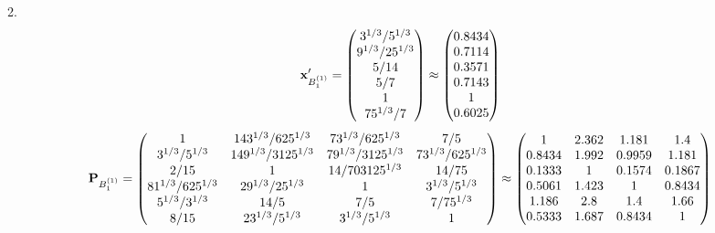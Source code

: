 \documentclass[10pt,a4paper]{article}
\begin{document}
	2.
	\[
		\bold{x}'_{B_1^{(1)}} = 
		\begin{pmatrix}
			{{3^ {1 / 3}}} / {{5^ {1 / 3}}} \\
			{{9^ {1 / 3}}} / {{25^ {1 / 3}}} \\
			{{5}} / {{14}} \\
			{{5}} / {{7}} \\
			{1}{} \\
			{{75^ {1 / 3}}} / {{7}} \\
		\end{pmatrix}
		\approx
		\begin{pmatrix}
			0.8434   \\
			0.7114   \\
			0.3571   \\
			0.7143   \\
			1        \\
			0.6025   \\
		\end{pmatrix}
	\]
	\[
		\bold{P}_{B_1^{(1)}} = 
		\begin{pmatrix}
			{1}{} & {{14}{3^ {1 / 3}}} / {{625^ {1 / 3}}} & {{7}{3^ {1 / 3}}} / {{625^ {1 / 3}}} & {{7}} / {{5}} \\
			{{3^ {1 / 3}}} / {{5^ {1 / 3}}} & {{14}{9^ {1 / 3}}} / {{3125^ {1 / 3}}} & {{7}{9^ {1 / 3}}} / {{3125^ {1 / 3}}} & {{7}{3^ {1 / 3}}} / {{625^ {1 / 3}}} \\
			{{2}} / {{15}} & {1}{} & {{14}} / {{703125^ {1 / 3}}} & {{14}} / {{75}} \\
			{{81^ {1 / 3}}} / {{625^ {1 / 3}}} & {{2}{9^ {1 / 3}}} / {{25^ {1 / 3}}} & {1}{} & {{3^ {1 / 3}}} / {{5^ {1 / 3}}} \\
			{{5^ {1 / 3}}} / {{3^ {1 / 3}}} & {{14}} / {{5}} & {{7}} / {{5}} & {{7}} / {{75^ {1 / 3}}} \\
			{{8}} / {{15}} & {{2}{3^ {1 / 3}}} / {{5^ {1 / 3}}} & {{3^ {1 / 3}}} / {{5^ {1 / 3}}} & {1}{} \\
		\end{pmatrix}
		\approx
		\begin{pmatrix}
			1        & 2.362    & 1.181    & 1.4      \\
			0.8434   & 1.992    & 0.9959   & 1.181    \\
			0.1333   & 1        & 0.1574   & 0.1867   \\
			0.5061   & 1.423    & 1        & 0.8434   \\
			1.186    & 2.8      & 1.4      & 1.66     \\
			0.5333   & 1.687    & 0.8434   & 1        \\
		\end{pmatrix}
	\]
\end{document}
